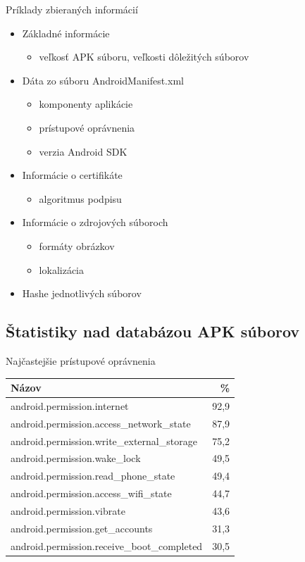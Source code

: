 \documentclass{beamer}
\begin{document}
   
    \begin{frame}[label=lists]{Príklady zbieraných informácií}
	 \begin{itemize}
			\item Základné informácie
			\begin{itemize}
				\item veľkosť APK súboru, veľkosti dôležitých súborov
			\end{itemize}
			\item Dáta zo súboru AndroidManifest.xml
			\begin{itemize}
				\item komponenty aplikácie
				\item prístupové oprávnenia
				\item verzia Android SDK
			\end{itemize}
			\item Informácie o certifikáte
			\begin{itemize}
				\item algoritmus podpisu
			\end{itemize}
			\item Informácie o zdrojových súboroch
			\begin{itemize}
				\item formáty obrázkov
				\item lokalizácia
			\end{itemize}
			\item Hashe jednotlivých súborov
		\end{itemize}	    
   \end{frame} 

\subsection{Štatistiky nad databázou APK súborov}
  \begin{frame}[label=lists]{Najčastejšie prístupové oprávnenia}
	 \begin{table}[!htbp]
\centering
  \begin{tabular}{|l r|}
    \hline
    Názov & \% \\\hline\hline
    android.permission.internet & 92,9 \\
    android.permission.access\_network\_state & 87,9 \\
    android.permission.write\_external\_storage & 75,2 \\
    android.permission.wake\_lock & 49,5 \\
    android.permission.read\_phone\_state & 49,4 \\
    android.permission.access\_wifi\_state & 44,7 \\
    android.permission.vibrate & 43,6 \\
    android.permission.get\_accounts & 31,3 \\
    android.permission.receive\_boot\_completed & 30,5 \\
    \hline
  \end{tabular}
  \label{tab:permissions}
\end{table}
  \end{frame} 
  
\end{document}
